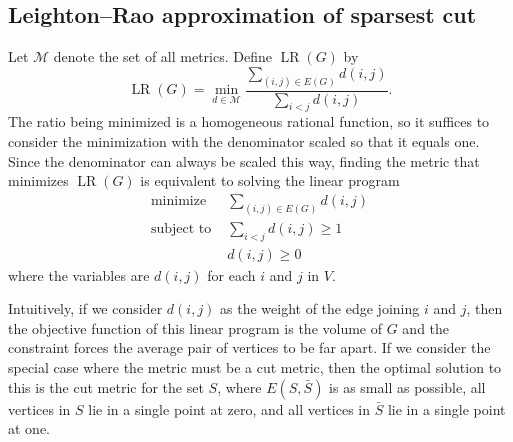 \documentclass[11pt]{article}
\newcommand{\0}{\mathbf{0}}
\newcommand{\1}{\mathbf{1}}
\DeclareMathOperator{\LR}{LR}
\begin{document}
\subsection{Leighton--Rao approximation of sparsest cut}

Let $\mathcal{M}$ denote the set of all metrics. Define $\LR(G)$ by
\begin{equation*}
  \LR(G) = \min_{d \in \mathcal{M}} \frac{\sum_{(i, j) \in E(G)} d(i, j)}{\sum_{i < j} d(i, j)}.
\end{equation*}
The ratio being minimized is a homogeneous rational function, so it suffices to consider the minimization with the denominator scaled so that it equals one.
Since the denominator can always be scaled this way, finding the metric that minimizes $\LR(G)$ is equivalent to solving the linear program
\begin{align*}
  \text{minimize } & \sum_{(i, j) \in E(G)} d(i, j) \\
  \text{subject to } & \sum_{i < j} d(i, j) \geq 1 \\
  & d(i, j) \geq 0
\end{align*}
where the variables are $d(i, j)$ for each $i$ and $j$ in $V$.

Intuitively, if we consider $d(i, j)$ as the weight of the edge joining $i$ and $j$, then the objective function of this linear program is the volume of $G$ and the constraint forces the average pair of vertices to be far apart.
If we consider the special case where the metric must be a cut metric, then the optimal solution to this is the cut metric for the set $S$, where $E(S, \bar{S})$ is as small as possible, all vertices in $S$ lie in a single point at zero, and all vertices in $\bar{S}$ lie in a single point at one.
\end{document}
